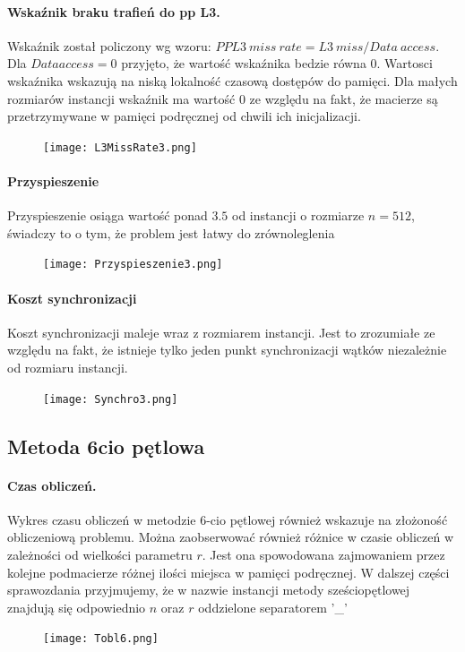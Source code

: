 \documentclass{scrartcl}
\begin{document}
\paragraph{Wskaźnik braku trafień do pp L3.} Wskaźnik został policzony wg wzoru: $PPL3\ miss\ rate = L3\ miss / Data\ access$. Dla $Data access = 0$ przyjęto, że wartość wskaźnika bedzie równa 0. Wartosci wskaźnika wskazują na niską lokalność czasową dostępów do pamięci. Dla małych rozmiarów instancji wskaźnik ma wartość 0 ze względu na fakt, że macierze są przetrzymywane w pamięci podręcznej od chwili ich inicjalizacji.
\begin{figure}[H]
\texttt{[image: L3MissRate3.png]}
\end{figure}
\paragraph{Przyspieszenie} Przyspieszenie osiąga wartość ponad $3.5$ od instancji o rozmiarze $n = 512$, świadczy to o tym, że problem jest łatwy do zrównoleglenia
\begin{figure}[H]
\texttt{[image: Przyspieszenie3.png]}
\end{figure}
\paragraph{Koszt synchronizacji} Koszt synchronizacji maleje wraz z rozmiarem instancji. Jest to zrozumiałe ze względu na fakt, że istnieje tylko jeden punkt synchronizacji wątków niezależnie od rozmiaru instancji.
\begin{figure}[H]
\texttt{[image: Synchro3.png]}
\end{figure}

\subsection{Metoda 6cio pętlowa}

\paragraph{Czas obliczeń.} Wykres czasu obliczeń w metodzie 6-cio pętlowej również wskazuje na złożoność obliczeniową problemu. Można zaobserwować również różnice w czasie obliczeń w zależności od wielkości parametru $r$. Jest ona spowodowana zajmowaniem przez kolejne podmacierze różnej ilości miejsca w pamięci podręcznej. W dalszej części sprawozdania przyjmujemy, że w nazwie instancji metody sześciopętlowej znajdują się odpowiednio $n$ oraz $r$ oddzielone separatorem '\_'
\begin{figure}[H]
\texttt{[image: Tobl6.png]}
\end{figure}
\end{document}
